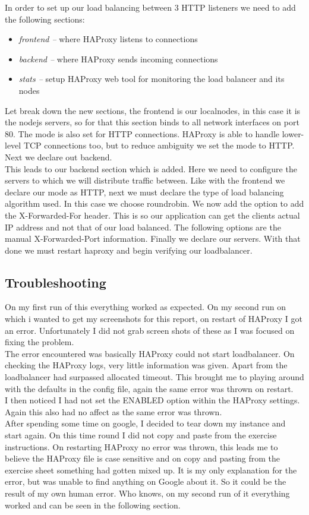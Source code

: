 In order to set up our load balancing between 3 HTTP listeners we need to add the following sections:
\begin{itemize}
    \item \textit{frontend --} where HAProxy listens to connections
    \item \textit{backend --} where HAProxy sends incoming connections
    \item \textit{stats --} setup HAProxy web tool for monitoring the load balancer and its nodes
\end{itemize}
Let break down the new sections, the frontend is our localnodes, in this case it is the nodejs servers, so for that this section binds to all network interfaces on port 80. The mode is also set for HTTP connections. HAProxy is able to handle lower-level TCP connections too, but to reduce ambiguity we set the mode to HTTP. Next we declare out backend.
\\ This leads to our backend section which is added. Here we need to configure the servers to which we will distribute traffic between. Like with the frontend we declare our mode as HTTP, next we must declare the type of load balancing algorithm used. In this case we choose roundrobin. We now add the option to add the X-Forwarded-For header. This is so our application can get the clients actual IP address and not that of our load balanced. The following options are the manual X-Forwarded-Port information. Finally we declare our servers. With that done we must restart haproxy and begin verifying our loadbalancer.

\subsection{Troubleshooting}
\label{sub:trouble1}
On my first run of this everything worked as expected. On my second run on which i wanted to get my screenshots for this report, on restart of HAProxy I got an error. Unfortunately I did not grab screen shots of these as I was focused on fixing the problem.
\\The error encountered was basically HAProxy could not start loadbalancer. On checking the HAProxy logs, very little information was given. Apart from the loadbalancer had surpassed allocated timeout. This brought me to playing around with the defaults in the config file, again the same error was thrown on restart. 
\\I then noticed I had not set the ENABLED option within the HAProxy settings. Again this also had no affect as the same error was thrown. 
\\After spending some time on google, I decided to tear down my instance and start again. On this time round I did not copy and paste from the exercise instructions. On restarting HAProxy no error was thrown, this leads me to believe the HAProxy file is case sensitive and on copy and pasting from the exercise sheet something had gotten mixed up. It is my only explanation for the error, but was unable to find anything on Google about it. So it could be the result of my own human error. Who knows, on my second run of it everything worked and can be seen in the following section.

